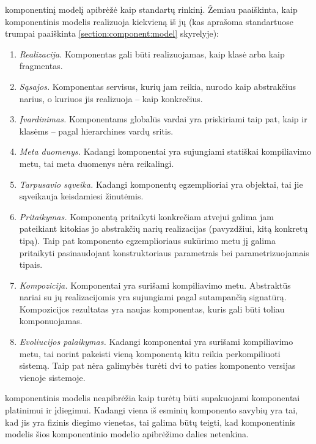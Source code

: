 \cite[37]{heineman2001component} komponentinį modelį apibrėžė kaip
standartų rinkinį. Žemiau paaiškinta, kaip 
komponentinis modelis realizuoja kiekvieną iš jų (kas aprašoma
standartuose trumpai paaiškinta \ref{section:component:model}
skyrelyje):
\begin{enumerate}
  \item \emph{Realizacija.}
    Komponentas gali būti realizuojamas, kaip  klasė
    arba kaip fragmentas.
  \item \emph{Sąsajos.}
    Komponentas servisus, kurių jam reikia, nurodo kaip abstrakčius
    narius, o kuriuos jis realizuoja – kaip konkrečius.
  \item \emph{Įvardinimas.}
    Komponentams globalūs vardai yra priskiriami taip pat, kaip ir
     klasėms – pagal hierarchines vardų sritis.
  \item \emph{Meta duomenys.} Kadangi  komponentai yra
    sujungiami statiškai kompiliavimo metu, tai meta duomenys nėra
    reikalingi.
  \item \emph{Tarpusavio sąveika.}
    Kadangi komponentų egzemplioriai  yra
    objektai, tai jie sąveikauja keisdamiesi žinutėmis.
  \item \emph{Pritaikymas.}
    Komponentą pritaikyti konkrečiam atvejui galima jam pateikiant
    kitokias jo abstrakčių narių realizacijas (pavyzdžiui, kitą
    konkretų tipą). Taip pat komponento egzemplioriaus sukūrimo
    metu jį galima pritaikyti pasinaudojant konstruktoriaus parametrais
    bei parametrizuojamais tipais.
  \item \emph{Kompozicija.}
    Komponentai yra surišami kompiliavimo metu. Abstraktūs nariai su
    jų realizacijomis yra sujungiami pagal sutampančią signatūrą.
    Kompozicijos rezultatas yra naujas komponentas, kuris gali būti
    toliau komponuojamas.
  \item \emph{Evoliucijos palaikymas.}
    Kadangi komponentai yra surišami kompiliavimo metu, tai norint
    pakeisti vieną komponentą kitu reikia perkompiliuoti sistemą.
    Taip pat nėra galimybės turėti dvi to paties komponento versijas
    vienoje sistemoje.
\end{enumerate}

 komponentinis modelis neapibrėžia kaip turėtų būti
supakuojami komponentai platinimui ir įdiegimui. Kadangi viena iš
esminių komponento savybių yra tai, kad jis yra fizinis
diegimo vienetas, tai galima būtų teigti, kad 
komponentinis modelis šios komponentinio modelio apibrėžimo dalies
netenkina.

